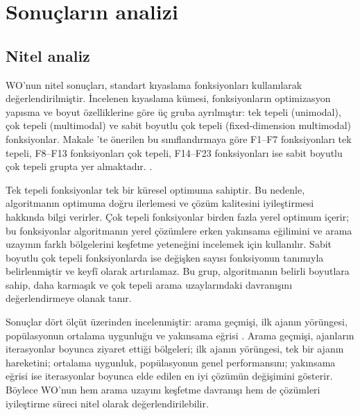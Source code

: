 \begingroup
\shorthandoff{=}
\renewcommand{\tablename}{Tablo}
\renewcommand{\figurename}{Şekil}
\graphicspath{{src/figures/}{figures/}}

\section{Sonuçların analizi}
\label{sec:benchmark-analysis}

\subsection{Nitel analiz}
WO'nun nitel sonuçları, standart kıyaslama fonksiyonları kullanılarak
değerlendirilmiştir. İncelenen kıyaslama kümesi, fonksiyonların optimizasyon
yapısına ve boyut özelliklerine göre üç gruba ayrılmıştır:
tek tepeli (unimodal), çok tepeli (multimodal) ve sabit boyutlu çok tepeli
(fixed-dimension multimodal) fonksiyonlar. Makale \cite{han2024walrus}’te önerilen 
bu sınıflandırmaya göre F1–F7 fonksiyonları tek tepeli, F8–F13 fonksiyonları çok tepeli, 
F14–F23 fonksiyonları ise sabit boyutlu çok tepeli grupta yer almaktadır.
\cite{han2024walrus}.

Tek tepeli fonksiyonlar tek bir küresel optimuma sahiptir. Bu nedenle,
algoritmanın optimuma doğru ilerlemesi ve çözüm kalitesini iyileştirmesi
hakkında bilgi verirler. Çok tepeli fonksiyonlar birden fazla yerel optimum
içerir; bu fonksiyonlar algoritmanın yerel çözümlere erken yakınsama
eğilimini ve arama uzayının farklı bölgelerini keşfetme yeteneğini incelemek
için kullanılır. Sabit boyutlu çok tepeli fonksiyonlarda ise değişken sayısı
fonksiyonun tanımıyla belirlenmiştir ve keyfî olarak artırılamaz. Bu grup,
algoritmanın belirli boyutlara sahip, daha karmaşık ve çok tepeli arama
uzaylarındaki davranışını değerlendirmeye olanak tanır.

Sonuçlar dört ölçüt üzerinden incelenmiştir: arama geçmişi, ilk ajanın
yörüngesi, popülasyonun ortalama uygunluğu ve yakınsama eğrisi
\cite{han2024walrus}. Arama geçmişi, ajanların iterasyonlar boyunca ziyaret
ettiği bölgeleri; ilk ajanın yörüngesi, tek bir ajanın hareketini; ortalama
uygunluk, popülasyonun genel performansını; yakınsama eğrisi ise iterasyonlar
boyunca elde edilen en iyi çözümün değişimini gösterir. Böylece WO'nun hem
arama uzayını keşfetme davranışı hem de çözümleri iyileştirme süreci nitel
olarak değerlendirilebilir.

